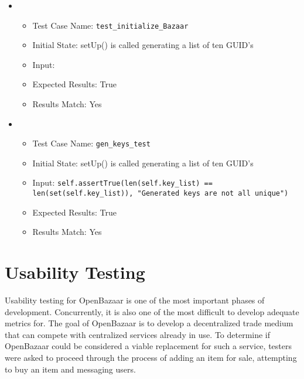 \documentclass{article}
\begin{document}
\begin{itemize}
\item
\begin{itemize}
\item Test Case Name: \texttt{test\_initialize\_Bazaar}
\item Initial State: setUp() is called generating a list of ten GUID's
\item Input:
\item Expected Results: True
\item Results Match: Yes\newline
\end{itemize}
\end{itemize}

\begin{itemize}
\item
\begin{itemize}
\item Test Case Name: \texttt{gen\_keys\_test}
\item Initial State: setUp() is called generating a list of ten GUID's
\item Input: \texttt{self.assertTrue(len(self.key\_list) == len(set(self.key\_list)), "Generated keys are not all unique")}
\item Expected Results: True
\item Results Match: Yes\newline
\end{itemize}
\end{itemize}

\section{Usability Testing}
Usability testing for OpenBazaar is one of the most important phases of development. Concurrently, it is also one of the most difficult to develop adequate metrics for. The goal of OpenBazaar is to develop a decentralized trade medium that can compete with centralized services already in use. \cite{reqs_doc} To determine if OpenBazaar could be considered a viable replacement for such a service, testers were asked to proceed through the process of adding an item for sale, attempting to buy an item and messaging users.
\end{document}
